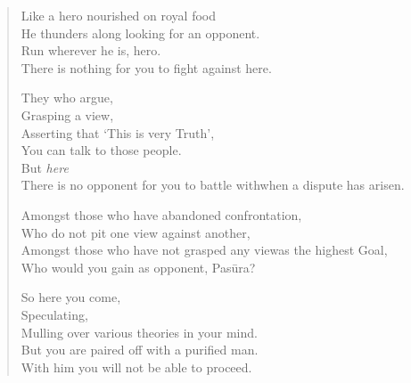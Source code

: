 \begin{verse}
 Like a hero nourished on royal food\\
He thunders along looking for an opponent.\\
Run wherever he is, hero.\\
There is nothing for you to fight against here.


 They who argue,\\
Grasping a view,\\
Asserting that `This is very Truth',\\
You can talk to those people.\\
But \emph{here}\\
There is no opponent for you to battle with\newline when a dispute has arisen.


 Amongst those who have abandoned confrontation,\\
Who do not pit one view against another,\\
Amongst those who have not grasped any view\newline as the highest Goal,\\
Who would you gain as opponent, Pasūra?


 So here you come,\\
Speculating,\\
Mulling over various theories in your mind.\\
But you are paired off with a purified man.\\
With him you will not be able to proceed.


\end{verse}
